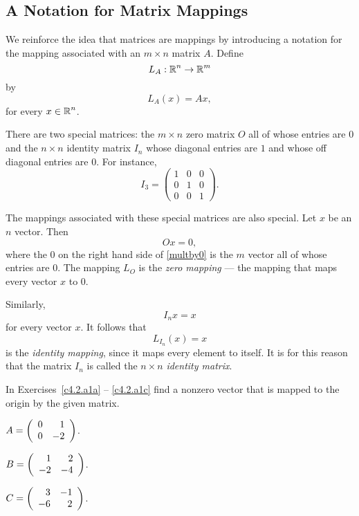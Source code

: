 \documentclass{ximera}
\begin{document}
\subsection*{A Notation for Matrix Mappings}

We reinforce the idea that matrices are mappings by introducing a notation 
for the mapping associated with an $m\times n$ matrix $A$.  Define
\[
L_A:\mbox{$\Bbb{R}$}^n\to\mbox{$\Bbb{R}$}^m
\]
by
\[
L_A(x) = Ax,
\]
for every $x\in\mbox{$\Bbb{R}$}^n$.

There are two special matrices:  the $m\times n$ zero matrix 
 $O$ all of whose entries are $0$ and the 
$n\times n$ identity matrix  $I_n$ whose diagonal 
entries are $1$ and whose off diagonal entries are $0$.  For instance,
\[
	I_3 = \left(
\begin{array}{rrr}
 1 & 0 & 0  \\
 0 & 1 & 0  \\
 0 & 0 & 1
\end{array}
\right).
\]

The mappings associated with these special matrices are also special.  
Let $x$ be an $n$ vector.  Then
\begin{equation} \label{multby0}
Ox=0,
\end{equation}
where the $0$ on the right hand side of \eqref{multby0} is the $m$
vector all of whose entries are $0$.  The mapping $L_O$ is the 
{\em zero mapping\/}  --- the mapping 
that maps every vector $x$ to $0$.

Similarly,
\[
I_nx=x
\]
for every vector $x$.  It follows that
\[
L_{I_n}(x) = x
\]
is the {\em identity mapping\/},  since
it maps every element to itself.  It is for this reason that the
matrix $I_n$ is called the $n\times n$ {\em identity matrix\/}.

\EXER

\TEXER

\noindent In Exercises~\ref{c4.2.a1a} -- \ref{c4.2.a1c} find a nonzero
vector that is mapped to the origin by the given matrix.
\begin{exercise} \label{c4.2.a1a}
$A=\left(\begin{array}{rr} 0 & 1\\ 0 &-2\end{array}\right)$.
\end{exercise}
\begin{exercise} \label{c4.2.a1b}
$B=\left(\begin{array}{rr} 1 & 2\\ -2 &-4\end{array}\right)$.
\end{exercise}
\begin{exercise} \label{c4.2.a1c}
$C=\left(\begin{array}{rr} 3 & -1\\ -6 &2\end{array}\right)$.
\end{exercise}
\end{document}
